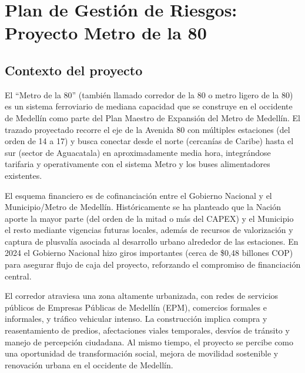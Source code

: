 
\section{Plan de Gestión de Riesgos: Proyecto Metro de la 80}

\subsection{Contexto del proyecto}

El ``Metro de la 80'' (también llamado corredor de la 80 o metro ligero de la 80) es un sistema ferroviario de mediana capacidad que se construye en el occidente de Medellín como parte del Plan Maestro de Expansión del Metro de Medellín. 
El trazado proyectado recorre el eje de la Avenida 80 con múltiples estaciones (del orden de 14 a 17) y busca conectar desde el norte (cercanías de Caribe) hasta el sur (sector de Aguacatala) en aproximadamente media hora, integrándose tarifaria y operativamente con el sistema Metro y los buses alimentadores existentes. %

El esquema financiero es de cofinanciación entre el Gobierno Nacional y el Municipio/Metro de Medellín. 
Históricamente se ha planteado que la Nación aporte la mayor parte (del orden de la mitad o más del CAPEX) y el Municipio el resto mediante vigencias futuras locales, además de recursos de valorización y captura de plusvalía asociada al desarrollo urbano alrededor de las estaciones. %
En 2024 el Gobierno Nacional hizo giros importantes (cerca de \$0{,}48 billones COP) para asegurar flujo de caja del proyecto, reforzando el compromiso de financiación central. %

El corredor atraviesa una zona altamente urbanizada, con redes de servicios públicos de Empresas Públicas de Medellín (EPM), comercios formales e informales, y tráfico vehicular intenso. La construcción implica compra y reasentamiento de predios, afectaciones viales temporales, desvíos de tránsito y manejo de percepción ciudadana. %
Al mismo tiempo, el proyecto se percibe como una oportunidad de transformación social, mejora de movilidad sostenible y renovación urbana en el occidente de Medellín. %

